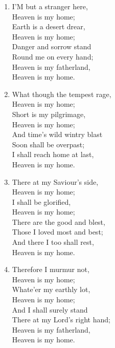 \begin{enumerate}
    \item I'M but a stranger here, \\
        Heaven is my home; \\
        Earth is a desert drear, \\
        Heaven is my home; \\
        Danger and sorrow stand \\
        Round me on every hand; \\
        Heaven is my fatherland, \\
        Heaven is my home.

    \item What though the tempest rage, \\
        Heaven is my home; \\
        Short is my pilgrimage, \\
        Heaven is my home; \\
        And time's wild wintry blast \\
        Soon shall be overpast; \\
        I shall reach home at last, \\
        Heaven is my home.

    \item There at my Saviour's side, \\
        Heaven is my home; \\
        I shall be glorified, \\
        Heaven is my home; \\
        There are the good and blest, \\
        Those I loved most and best; \\
        And there I too shall rest, \\
        Heaven is my home.

    \item Therefore I murmur not, \\
        Heaven is my home; \\
        Whate'er my earthly lot, \\
        Heaven is my home; \\
        And I shall surely stand \\
        There at my Lord's right hand; \\
        Heaven is my fatherland, \\
        Heaven is my home.

\end{enumerate}

